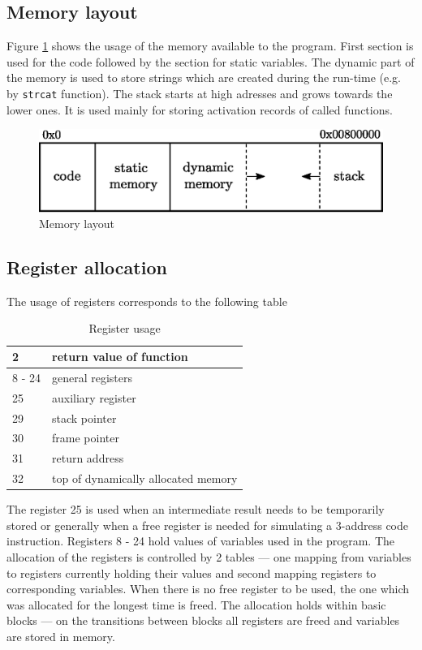\documentclass[a4paper]{article}[25.12.2015]
\begin{document}
\subsection*{Memory layout}
Figure \ref{fig:memlay} shows the usage of the memory available to the program. First section is used for the code followed by the section for static variables. The dynamic part of the memory is used to store strings which are created during the run-time (e.g. by \verb|strcat| function). The stack starts at high adresses and grows towards the lower ones. It is used mainly for storing activation records of called functions.

\begin{figure}[H]
\centering
\includegraphics[scale=0.6]{memory.eps}
\caption{Memory layout}
\label{fig:memlay}
\end{figure}

\subsection*{Register allocation}
The usage of registers corresponds to the following table
\begin{table}[H]
\centering
\begin{tabular}{|l|l|}
\hline
2 & return value of function \\ \hline
8 - 24 & general registers \\ \hline
25 & auxiliary register \\ \hline
29 & stack pointer \\ \hline
30 & frame pointer \\ \hline
31 & return address \\ \hline
32 & top of dynamically allocated memory \\ \hline
\end{tabular}
\caption{Register usage}
\label{tab:regs}
\end{table}

The register 25 is used when an intermediate result needs to be temporarily stored or generally when a free register is needed for simulating a 3-address code instruction. Registers 8 - 24 hold values of variables used in the program. The allocation of the registers is controlled by 2 tables --- one mapping from variables to registers currently holding their values and second mapping registers to corresponding variables. When there is no free register to be used, the one which was allocated for the longest time is freed. The allocation holds within basic blocks --- on the transitions between blocks all registers are freed and variables are stored in memory.
\end{document}
